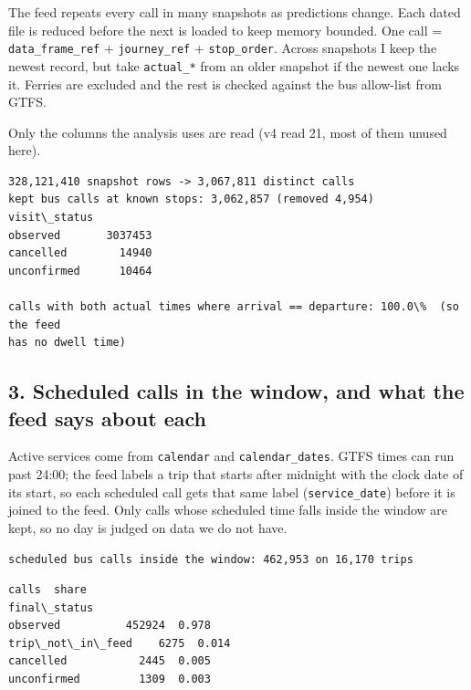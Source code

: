 \documentclass[11pt]{article}
\begin{document}
The feed repeats every call in many snapshots as predictions change.
Each dated file is reduced before the next is loaded to keep memory
bounded. One call = \texttt{data\_frame\_ref} + \texttt{journey\_ref} +
\texttt{stop\_order}. Across snapshots I keep the newest record, but
take \texttt{actual\_*} from an older snapshot if the newest one lacks
it. Ferries are excluded and the rest is checked against the bus
allow-list from GTFS.

Only the columns the analysis uses are read (v4 read 21, most of them
unused here).

    \begin{Verbatim}[commandchars=\\\{\}]
328,121,410 snapshot rows -> 3,067,811 distinct calls
kept bus calls at known stops: 3,062,857 (removed 4,954)
visit\_status
observed       3037453
cancelled        14940
unconfirmed      10464

calls with both actual times where arrival == departure: 100.0\%  (so the feed
has no dwell time)
    \end{Verbatim}

    \subsection{3. Scheduled calls in the window, and what the feed says
about
each}\label{scheduled-calls-in-the-window-and-what-the-feed-says-about-each}

Active services come from \texttt{calendar} and
\texttt{calendar\_dates}. GTFS times can run past 24:00; the feed labels
a trip that starts after midnight with the clock date of its start, so
each scheduled call gets that same label (\texttt{service\_date}) before
it is joined to the feed. Only calls whose scheduled time falls inside
the window are kept, so no day is judged on data we do not have.

    \begin{Verbatim}[commandchars=\\\{\}]
scheduled bus calls inside the window: 462,953 on 16,170 trips
    \end{Verbatim}

    
    \begin{Verbatim}[commandchars=\\\{\}]
                   calls  share
final\_status                   
observed          452924  0.978
trip\_not\_in\_feed    6275  0.014
cancelled           2445  0.005
unconfirmed         1309  0.003
    \end{Verbatim}
\end{document}
